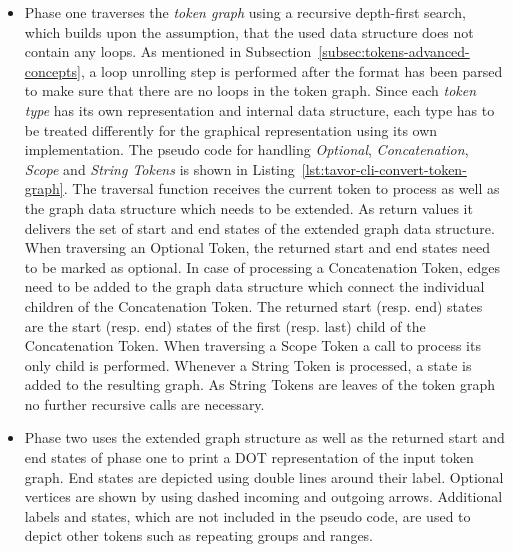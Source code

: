 \begin{itemize}
\item Phase one traverses the \emph{token graph} using a recursive depth-first search, which builds upon the assumption, that the used data structure does not contain any loops. As mentioned in Subsection~\ref{subsec:tokens-advanced-concepts}, a loop unrolling step is performed after the format has been parsed to make sure that there are no loops in the token graph. Since each \emph{token type} has its own representation and internal data structure, each type has to be treated differently for the graphical representation using its own implementation. The pseudo code for handling \emph{Optional}, \emph{Concatenation}, \emph{Scope} and \emph{String Tokens} is shown in Listing~\ref{lst:tavor-cli-convert-token-graph}. The traversal function receives the current token to process as well as the graph data structure which needs to be extended. As return values it delivers the set of start and end states of the extended graph data structure.
When traversing an Optional Token, the returned start and end states need to be marked as optional. In case of processing a Concatenation Token, edges need to be added to the graph data structure which connect the individual children of the Concatenation Token. The returned start (resp. end) states are the start (resp. end) states of the first (resp. last) child of the Concatenation Token. When traversing a Scope Token a call to process its only child is performed. Whenever a String Token is processed, a state is added to the resulting graph. As String Tokens are leaves of the token graph no further recursive calls are necessary.
\item Phase two uses the extended graph structure as well as the returned start and end states of phase one to print a DOT representation of the input token graph. End states are depicted using double lines around their label. Optional vertices are shown by using dashed incoming and outgoing arrows. Additional labels and states, which are not included in the pseudo code, are used to depict other tokens such as repeating groups and ranges.
\end{itemize}

